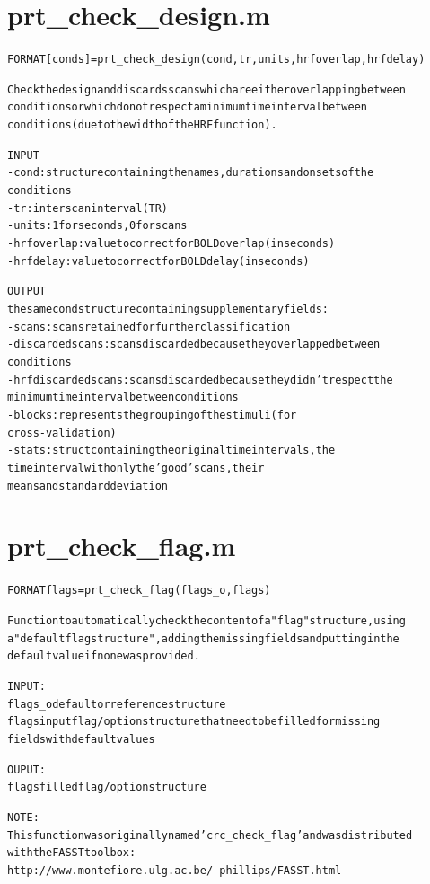 \section{prt\_check\_design.m}
\begin{alltt}

 FORMAT [conds] = prt\_check\_design(cond,tr,units,hrfoverlap,hrfdelay)
 
 Check the design and discards scans which are either overlapping between
 conditions or which do not respect a minimum time interval between
 conditions (due to the width of the HRF function).
 
 INPUT
   - cond  :   structure containing the names, durations and onsets of the
               conditions
   - tr    :   interscan interval (TR)
   - units :   1 for seconds, 0 for scans
   - hrfoverlap : value to correct for BOLD overlap (in seconds)
   - hrfdelay   : value to correct for BOLD delay (in seconds)
 
 OUTPUT
 the same cond structure containing supplementary fields:
   - scans :            scans retained for further classification
   - discardedscans:    scans discarded because they overlapped between 
                        conditions
   - hrfdiscardedscans: scans discarded because they didn't respect the
                        minimum time interval between conditions
   - blocks:            represents the grouping of the stimuli (for
                        cross-validation)
   - stats:             struct containing the original time intervals, the
                        time interval with only the 'good' scans, their
                        means and standard deviation
\end{alltt}


\section{prt\_check\_flag.m}
\begin{alltt}

 FORMAT flags = prt\_check\_flag(flags\_o,flags)
 
 Function to automatically check the content of a "flag" structure, using
 a "default flag structure", adding the missing fields and putting in the 
 default value if none was provided.
 
 INPUT:
 flags\_o   default or reference structure
 flags     input flag/option structure that need to be filled for missing
           fields with default values
 
 OUPUT:
 flags     filled flag/option structure
 
 NOTE:
 This function was originally named 'crc\_check\_flag' and was distributed 
 with the FASST toolbox:
   http://www.montefiore.ulg.ac.be/~phillips/FASST.html
\end{alltt}


